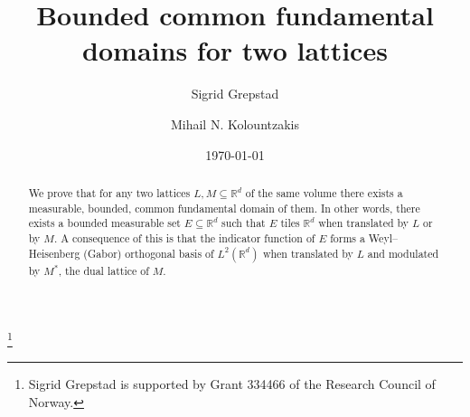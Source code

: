 \documentclass[12pt,a4paper,oneside]{amsart}
\theoremstyle{plain}
\theoremstyle{definition}
\newcommand{\Set}[1]{{\left\{{#1}\right\}}}
\newcommand{\RR}{{\mathbb R}}
\newcommand{\ZZ}{{\mathbb Z}}
\begin{document}
\sloppy

\title{Bounded common fundamental domains for two lattices}

\author{Sigrid Grepstad}
\address{\href{https://www.ntnu.edu/imf}{Department of Mathematical Sciences}, Norwegian University of Science and Technology (NTNU), NO-7491, Trondheim, Norway.}

\author{Mihail N. Kolountzakis}
\address{\href{http://math.uoc.gr/en/index.html}{Department of Mathematics and Applied Mathematics}, University of Crete,\\Voutes Campus, 70013 Heraklion, Greece,\newline and \newline \href{https://ics.forth.gr/}{Institute of Computer Science}, Foundation of Research and Technology Hellas, N. Plastira 100, Vassilika Vouton, 700 13, Heraklion, Greece}

\makeatletter
{}
\makeatother
{}
\thanks{Sigrid Grepstad is supported by Grant 334466 of the Research Council of Norway.}


\begin{abstract}
We prove that for any two lattices $L, M \subseteq \RR^d$ of the same volume there exists a measurable, bounded, common fundamental domain of them. In other words, there exists a bounded measurable set $E \subseteq \RR^d$ such that $E$ tiles $\RR^d$ when translated by $L$ or by $M$. A consequence of this is that the indicator function of $E$ forms a Weyl--Heisenberg (Gabor) orthogonal basis of $L^2(\RR^d)$ when translated by $L$ and modulated by $M^*$, the dual lattice of {$M$}.
\end{abstract}

\date{\today}

\maketitle

\tableofcontents

\newcommand{\trn}{\Set{0}^m\times\RR^n}%
\newcommand{\ztrn}{\ZZ^m\times\RR^n}%
\end{document}
